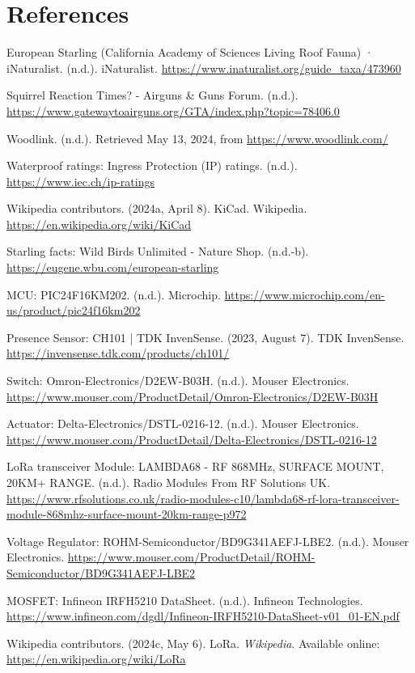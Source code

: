 \documentclass[12pt,a4paper]{article}
\begin{document}
\section{References}
\begin{thebibliography}{9}
    European Starling (California Academy of Sciences Living Roof Fauna) ·  iNaturalist. (n.d.). iNaturalist. 
    \url{https://www.inaturalist.org/guide_taxa/473960}
    
    Squirrel Reaction Times? - Airguns \& Guns Forum. (n.d.).
    \url{https://www.gatewaytoairguns.org/GTA/index.php?topic=78406.0}
    
    Woodlink. (n.d.). Retrieved May 13, 2024, from \url{https://www.woodlink.com/}
    
    Waterproof ratings: Ingress Protection (IP) ratings. (n.d.). 
    \url{https://www.iec.ch/ip-ratings}
    
    Wikipedia contributors. (2024a, April 8). KiCad. Wikipedia. 
    \url{https://en.wikipedia.org/wiki/KiCad}
    
    Starling facts: Wild Birds Unlimited - Nature Shop. (n.d.-b). 
    \url{https://eugene.wbu.com/european-starling}
    
    MCU: PIC24F16KM202. (n.d.). Microchip. 
    \url{https://www.microchip.com/en-us/product/pic24f16km202}
    
    Presence Sensor: CH101 | TDK InvenSense. (2023, August 7). TDK InvenSense. 
    \url{https://invensense.tdk.com/products/ch101/}
    
    Switch: Omron-Electronics/D2EW-B03H. (n.d.). Mouser Electronics. 
    \url{https://www.mouser.com/ProductDetail/Omron-Electronics/D2EW-B03H}
    
    Actuator: Delta-Electronics/DSTL-0216-12. (n.d.). Mouser Electronics.
    \url{https://www.mouser.com/ProductDetail/Delta-Electronics/DSTL-0216-12}
    
    LoRa transceiver Module: LAMBDA68 - RF 868MHz, SURFACE MOUNT, 20KM+ RANGE. (n.d.). Radio Modules From RF Solutions UK. 
    \url{https://www.rfsolutions.co.uk/radio-modules-c10/lambda68-rf-lora-transceiver-module-868mhz-surface-mount-20km-range-p972}

    Voltage Regulator: ROHM-Semiconductor/BD9G341AEFJ-LBE2. (n.d.). Mouser Electronics.
    \url{https://www.mouser.com/ProductDetail/ROHM-Semiconductor/BD9G341AEFJ-LBE2}
    
    MOSFET: Infineon IRFH5210 DataSheet. (n.d.). Infineon Technologies. 
    \url{https://www.infineon.com/dgdl/Infineon-IRFH5210-DataSheet-v01_01-EN.pdf}

    Wikipedia contributors. (2024c, May 6). LoRa. \textit{Wikipedia}. Available online: \url{https://en.wikipedia.org/wiki/LoRa}

\end{thebibliography}

    
\end{document}
